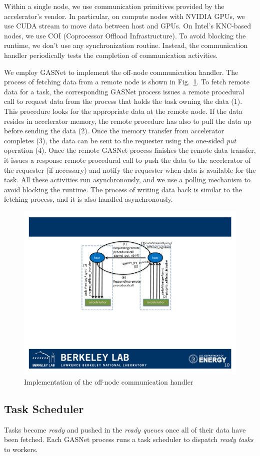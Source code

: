 Within a single node, we use communication primitives provided by the accelerator's vendor.
In particular, on compute nodes with NVIDIA GPUs, we use CUDA stream to move data between host and GPUs.
On Intel's KNC-based nodes, we use COI (Coprocessor Offload Infrastructure).
To avoid blocking the runtime, we don't use any synchronization routine.
Instead, the communication handler periodically tests the completion of communication activities.

We employ GASNet to implement the off-node communication handler.
The process of fetching data from a remote node is shown in Fig.~\ref{fig:offnode}.
To fetch remote data for a task, the corresponding GASNet process issues a remote procedural call to request data from the process that holds the task owning the data (1).
This procedure looks for the appropriate data at the remote node.
If the data resides in accelerator memory, the remote procedure has also to pull the data up before sending the data (2).
Once the memory transfer from accelerator completes (3), the data can be sent to the requester using the one-sided {\em put} operation (4).
Once the remote GASNet process finishes the remote data transfer, it issues a response remote procedural call to push the data to the accelerator of the requester (if necessary) and notify the requester when data is available for the task.
All these activities run asynchronously, and we use a polling mechanism to avoid blocking the runtime.
The process of writing data back is similar to the fetching process, and it is also handled asynchronously.


\begin{figure}[htb]
\centering
\includegraphics[width=.49\textwidth]{figures/handler.pdf}
\caption{Implementation of the off-node communication handler}
\label{fig:offnode}
\end{figure}

\subsection{Task Scheduler}
Tasks become {\em ready} and pushed in the {\em ready queues} once all of their data have been fetched.
Each GASNet process runs a task scheduler to dispatch {\em ready tasks} to workers. 

